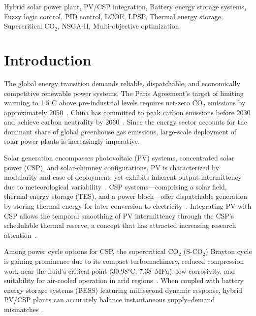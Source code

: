 \documentclass[journal]{IEEEtran}
\begin{document}
\begin{IEEEkeywords}
Hybrid solar power plant, PV/CSP integration, Battery energy storage systems, Fuzzy logic control, PID control, LCOE, LPSP, Thermal energy storage, Supercritical CO$_2$, NSGA-II, Multi-objective optimization
\end{IEEEkeywords}

\section{Introduction}
\label{sec:intro}

The global energy transition demands reliable, dispatchable, and economically competitive renewable power systems. The Paris Agreement's target of limiting warming to 1.5$^\circ$C above pre-industrial levels requires net-zero CO$_2$ emissions by approximately 2050~\cite{ipcc2018}. China has committed to peak carbon emissions before 2030 and achieve carbon neutrality by 2060~\cite{liu2022}. Since the energy sector accounts for the dominant share of global greenhouse gas emissions, large-scale deployment of solar power plants is increasingly imperative.

Solar generation encompasses photovoltaic (PV) systems, concentrated solar power (CSP), and solar-chimney configurations. PV is characterized by modularity and ease of deployment, yet exhibits inherent output intermittency due to meteorological variability~\cite{petrollese2016}. CSP systems---comprising a solar field, thermal energy storage (TES), and a power block---offer dispatchable generation by storing thermal energy for later conversion to electricity~\cite{starke2018}. Integrating PV with CSP allows the temporal smoothing of PV intermittency through the CSP's schedulable thermal reserve, a concept that has attracted increasing research attention~\cite{zurita2018, zurita2021}.

Among power cycle options for CSP, the supercritical CO$_2$ (S-CO$_2$) Brayton cycle is gaining prominence due to its compact turbomachinery, reduced compression work near the fluid's critical point (30.98$^\circ$C, 7.38~MPa), low corrosivity, and suitability for air-cooled operation in arid regions~\cite{liu2022}. When coupled with battery energy storage systems (BESS) featuring millisecond dynamic response, hybrid PV/CSP plants can accurately balance instantaneous supply--demand mismatches~\cite{luo2015}.
\end{document}
